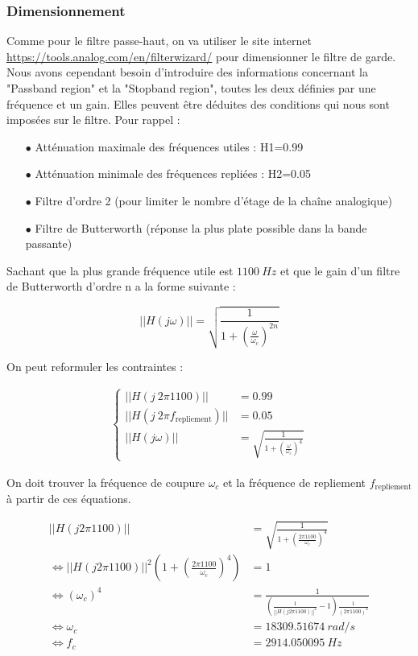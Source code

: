 \subsubsection{Dimensionnement}

Comme pour le filtre passe-haut, on va utiliser le site internet \url{https://tools.analog.com/en/filterwizard/} pour dimensionner le filtre de garde. Nous avons cependant besoin d'introduire des informations concernant la "Passband region" et la "Stopband region", toutes les deux définies par une fréquence et un gain. Elles peuvent être déduites des conditions qui nous sont imposées sur le filtre. Pour rappel :

\begin{enumerate}
    \item[$\bullet$] Atténuation maximale des fréquences utiles : H1=0.99
    \item[$\bullet$] Atténuation minimale des fréquences repliées : H2=0.05
    \item[$\bullet$] Filtre d'ordre 2 (pour limiter le nombre d'étage de la chaîne analogique)
    \item[$\bullet$] Filtre de Butterworth (réponse la plus plate possible dans la bande passante)
\end{enumerate}

Sachant que la plus grande fréquence utile est $1100 \ Hz$ et que le gain d'un filtre de Butterworth d'ordre n a la forme suivante :

$$
||H(j\omega)|| = \sqrt{\frac{1}{1+\left(\frac{\omega}{\omega_c}\right)^{2n}}}
$$

On peut reformuler les contraintes :

\begin{align*}
\begin{cases}
||H(j \ 2 \pi1100 )||&=0.99 \\
||H(j \ 2 \pi f_{\text{repliement}})||&=0.05 \\
||H(j\omega)|| &= \sqrt{\frac{1}{1+\left(\frac{\omega}{\omega_c}\right)^{4}}}
\end{cases}
\end{align*}

On doit trouver la fréquence de coupure $\omega_c$ et la fréquence de repliement $f_{\text{repliement}}$ à partir de ces équations.

\begin{align*} 
||H(j2\pi 1100)|| &= \sqrt{\frac{1}{1+\left(\frac{2\pi 1100}{\omega_c}\right)^{4}}}\\
\iff ||H(j2\pi 1100)||^{2} \left(1+\left(\frac{2\pi 1100}{\omega_c}\right)^{4}\right) &= 1\\
\iff (\omega_c)^{4} &=\frac{1}{ \left(\frac{1}{||H(j2\pi 1100)||^{2}}-1\right) \frac{1}{(2\pi 1100)^{4}} }\\
\iff \omega_c&= 18309.51674 \ rad/s\\
\iff f_c &=  2914.050095 \ Hz
\end{align*}

